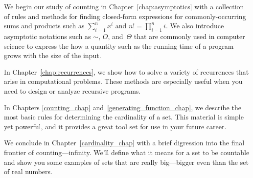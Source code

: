 We begin our study of counting in Chapter~\ref{chap:asymptotics} with
a collection of rules and methods for finding closed-form expressions
for commonly-occurring sums and products such as $\sum_{i = 1}^n x^i$
and $n! = \prod_{i=1}^n i$.  We also introduce asymptotic notations
such as $\sim$, $O$, and~$\Theta$ that are commonly used in computer
science to express the how a quantity such as the running time of a
program grows with the size of the input.

In Chapter~\ref{chap:recurrences}, we show how to solve a variety of
recurrences that arise in computational problems.  These methods are
especially useful when you need to design or analyze recursive
programs.

In Chapters \ref{counting_chap} and~\ref{generating_function_chap}, we
describe the most basic rules for determining the cardinality of a
set.  This material is simple yet powerful, and it provides a great
tool set for use in your future career.

We conclude in Chapter~\ref{cardinality_chap} with a brief digression
into the final frontier of counting---infinity.  We'll define what it
means for a set to be countable and show you some examples of sets
that are really big---bigger even than the set of real numbers.

\endinput
